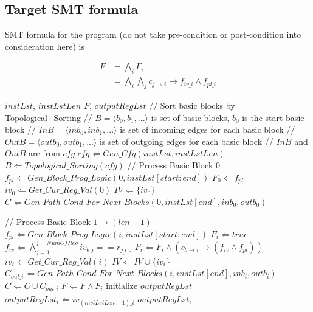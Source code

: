 \documentclass{article}
\begin{document}
\subsection{Target SMT formula}
SMT formula for the program (do not take pre-condition or post-condition into consideration here) is

\begin{equation}
\begin{aligned}
F &= \bigwedge_i F_{i} \\
  &= \bigwedge_i \bigwedge_j c_{j\rightarrow i}\rightarrow f_{iv\_i} \wedge f_{pl\_i}
\end{aligned}
\end{equation}

\begin{algorithm}
\begin{algorithmic}[1]
\caption{SMT\_Prog}
\label{alg:smt_prog}
\REQUIRE $instLst$, $instLstLen$
\ENSURE $F$, $outputRegLst$
\STATE // Sort basic blocks by Topological\_Sorting
\STATE // $B = \langle b_0, b_1, ...\rangle$ is set of basic blocks, $b_0$ is the start basic block
\STATE // $InB = \langle inb_0, inb_1, ...\rangle$ is set of incoming edges for each basic block
\STATE // $OutB = \langle outb_0, outb_1, ...\rangle$ is set of outgoing edges for each basic block
\STATE // $InB$ and $OutB$ are from $cfg$
\STATE $cfg \Leftarrow Gen\_Cfg(instLst, instLstLen)$
\STATE $B \Leftarrow Topological\_Sorting(cfg)$
\STATE
\STATE // Process Basic Block 0
\STATE $f_{pl} \Leftarrow Gen\_Block\_Prog\_Logic(0,instLst[start:end])$
\STATE $F_0 \Leftarrow f_{pl}$
\STATE $iv_0 \Leftarrow Get\_Cur\_Reg\_Val(0)$
\STATE $IV \Leftarrow \{iv_0\}$
\STATE $C \Leftarrow Gen\_Path\_Cond\_For\_Next\_Blocks(0, instLst[end], inb_0, outb_0)$

\STATE
\STATE // Process Basic Block $1 \rightarrow (len-1)$
\STATE $f_{pl} \Leftarrow Gen\_Block\_Prog\_Logic(i,instLst[start:end])$
\STATE $F_i \Leftarrow true$
\STATE $f_{iv} \Leftarrow \bigwedge_{j=1}^{j=NumOfReg} iv_{b_\_j} ==  r_{j_\_i_\_0}$
\STATE $F_i \Leftarrow F_i \wedge (c_{b \rightarrow i} \rightarrow (f_{iv} \wedge f_{pl}))$
\ENDFOR
\STATE $iv_i \Leftarrow Get\_Cur\_Reg\_Val(i)$
\STATE $IV \Leftarrow IV \cup \{iv_i\}$
\STATE $C_{out\_i} \Leftarrow Gen\_Path\_Cond\_For\_Next\_Blocks(i, instLst[end], inb_i, outb_i)$
\STATE $C \Leftarrow C \cup C_{out_\_i}$
\ENDFOR
\STATE
{}
\STATE $F \Leftarrow F \wedge F_i$
\ENDFOR
\STATE
\STATE initialize $outputRegLst$
\STATE $outputRegLst_i \Leftarrow iv_{(instLstLen-1)\_i}$
\ENDFOR
\RETURN $outputRegLst_i$
\end{algorithmic}
\end{algorithm}
\end{document}
